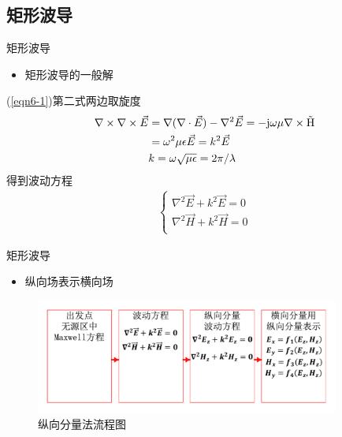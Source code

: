\subsection{矩形波导}

\begin{frame}{矩形波导}
    \begin{itemize}
        \item 矩形波导的一般解
    \end{itemize}
    (\ref{eqn6-1})第二式两边取旋度
    \begin{align*}
        \nabla\times\nabla\times\vec{E} & =\nabla(\nabla\cdot\vec{E})-\nabla^2\vec{E}=-\rm{j}\omega\mu\nabla\times\vec{H} \\
                                        & =\omega^2\mu\epsilon\vec{E}=k^2\vec{E}\\
                                        &k=\omega\sqrt{\mu\epsilon}=2\pi/\lambda
    \end{align*}
    得到波动方程
    \begin{align}
        \begin{cases}
            \nabla^2\vec{E}+k^2\vec{E}=0 \\
            \nabla^2\vec{H}+k^2\vec{H}=0 \\
        \end{cases}\label{eqn6-2}
    \end{align}
\end{frame}

\begin{frame}{矩形波导}
    \begin{itemize}
        \item 纵向场表示横向场
    \end{itemize}
    \centering
    \begin{figure}
        \includegraphics[width=10cm]{Cha6/fig6-2.pdf}
        \caption{纵向分量法流程图}   %
    \end{figure} 
\end{frame}

